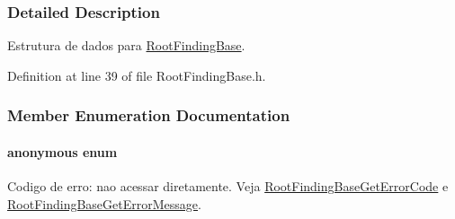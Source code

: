 \subsubsection{Detailed Description}
Estrutura de dados para \hyperlink{structRootFindingBase}{RootFindingBase}. 

Definition at line 39 of file RootFindingBase.h.

\subsubsection{Member Enumeration Documentation}
\hypertarget{structRootFindingBase_63c3383c7a423657e53c74135d7fcc1a}{
\paragraph["@0]{\setlength{\rightskip}{0pt plus 5cm}anonymous enum}\hfill}
\label{structRootFindingBase_63c3383c7a423657e53c74135d7fcc1a}


Codigo de erro: nao acessar diretamente. Veja \hyperlink{group____roots_gbcf354e731e02c63652af3a2058e739d}{RootFindingBaseGetErrorCode} e \hyperlink{group____roots_gcc5a0a8948e4b02a878f8d534c0bc982}{RootFindingBaseGetErrorMessage}. 

